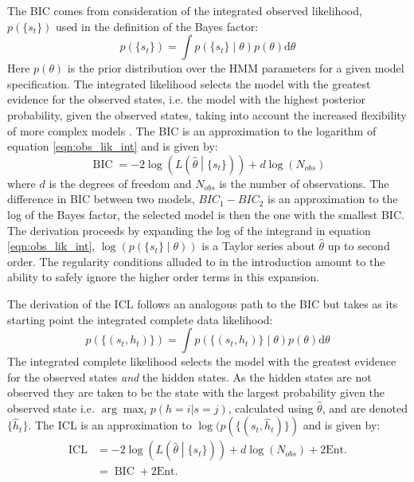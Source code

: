 The BIC comes from consideration of the integrated observed likelihood, $p(\{s_t\})$ used in the definition of the Bayes factor: 
\begin{equation}\label{eqn:obs_lik_int}
        p(\{s_t\}) = \int p\left(\{s_{t}\}\middle |\theta \right)p(\theta) \mathrm{d}\theta
\end{equation}
Here $p(\theta)$ is the prior distribution over the HMM parameters for a given model specification. The integrated likelihood selects the model with the greatest evidence for the observed states, i.e. the model with the highest posterior probability, given the observed states, taking into account the increased flexibility of more complex models \cite{mackay2003information}\cite{kassBayesFactors1995}. The BIC is an approximation to the logarithm of equation \ref{eqn:obs_lik_int} and is given by:
\begin{equation}\label{eqn:bic}
    \operatorname{BIC} = -2\log{\left(L\left(\hat{\theta}\middle| \{s_t\}\right)\right)} + d\log{\left(N_{obs}\right)}
\end{equation}
where $d$ is the degrees of freedom and $N_{obs}$ is the number of observations.  The difference in BIC between two models, $BIC_{1}-BIC_{2}$ is an approximation to the log of the Bayes factor, the selected model is then the one with the smallest BIC.  The derivation proceeds by expanding the log of the integrand in equation \ref{eqn:obs_lik_int},  $\log{\left(p\left(\{s_{t}\}\middle |\theta \right)\right)}$ is a Taylor series about $\hat{\theta}$ up to second order. The regularity conditions alluded to in the introduction amount to the ability to safely ignore the higher order terms in this expansion.  

The derivation of the ICL follows an analogous path to the BIC but takes as its starting point the integrated complete data likelihood: 
\begin{equation}\label{eqn:class_lik_int}
    p\left(\{(s_t, h_t)\}\right) = \int p\left(\{(s_{t}, h_{t})\}\middle |\theta \right)p(\theta) \mathrm{d}\theta
\end{equation}
The integrated complete likelihood selects the model with the greatest evidence for the observed states \emph{and} the hidden states. As the hidden states are not observed they are taken to be the state with the largest probability given the observed state i.e. $\arg\max_{i}p(h=i|s=j)$, calculated using $\hat{\theta}$, and are denoted $\{\hat{h}_{t}\}$. The ICL is an approximation to $\log{(p(\{(s_t, \hat{h}_t)\})}$ and is given by: 
\begin{equation}\label{eqn:icl}
\begin{split}
        \operatorname{ICL} &= -2\log{\left(L\left(\hat{\theta}\middle|\{s_t\}\right)\right)} + d\log{\left(N_{obs}\right)} +2\mathrm{Ent.}     \\
        & = \operatorname{BIC} + 2\mathrm{Ent.}
\end{split}
\end{equation}

